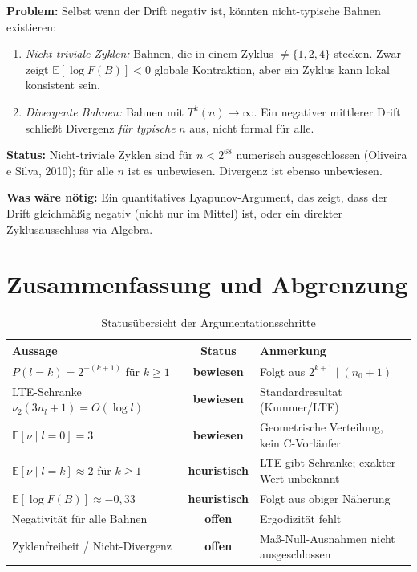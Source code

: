 \documentclass[12pt,a4paper]{article}
\newcommand{\vii}{\nu_2}
\newcommand{\E}{\mathbb{E}}
\newcommand{\logF}{\log F(B)}
\begin{document}
\begin{tcolorbox}[lücke, title={Offene Lücke 2: Maß-Null-Ausnahmen}]
\textbf{Problem:} Selbst wenn der Drift negativ ist, könnten
nicht-typische Bahnen existieren:
\begin{enumerate}[noitemsep]
  \item \emph{Nicht-triviale Zyklen:} Bahnen, die in einem Zyklus
        $\neq \{1,2,4\}$ stecken.
        Zwar zeigt $\E[\logF] < 0$ globale Kontraktion,
        aber ein Zyklus kann lokal konsistent sein.
  \item \emph{Divergente Bahnen:} Bahnen mit $T^k(n) \to \infty$.
        Ein negativer mittlerer Drift schließt Divergenz
        \emph{für typische} $n$ aus, nicht formal für alle.
\end{enumerate}

\textbf{Status:}
Nicht-triviale Zyklen sind für $n < 2^{68}$ numerisch ausgeschlossen
(Oliveira e Silva, 2010); für alle $n$ ist es unbewiesen.
Divergenz ist ebenso unbewiesen.

\textbf{Was wäre nötig:}
Ein quantitatives Lyapunov-Argument, das zeigt, dass der Drift
gleichmäßig negativ (nicht nur im Mittel) ist,
oder ein direkter Zyklusausschluss via Algebra.
\end{tcolorbox}

\section{Zusammenfassung und Abgrenzung}
\label{sec:zusammenfassung}

\begin{table}[h!]
\centering
\caption{Statusübersicht der Argumentationsschritte}
\label{tab:status}
\renewcommand{\arraystretch}{1.4}
\begin{tabular}{p{5.5cm} c p{6.5cm}}
\toprule
\textbf{Aussage} & \textbf{Status} & \textbf{Anmerkung} \\
\midrule
$P(l=k) = 2^{-(k+1)}$ für $k \geq 1$
  & \textcolor{bewiesengrün}{\textbf{bewiesen}}
  & Folgt aus $2^{k+1} \mid (n_0+1)$ \\
LTE-Schranke $\vii(3n_l+1) = O(\log l)$
  & \textcolor{bewiesengrün}{\textbf{bewiesen}}
  & Standardresultat (Kummer/LTE) \\
$\E[\nu \mid l{=}0] = 3$
  & \textcolor{bewiesengrün}{\textbf{bewiesen}}
  & Geometrische Verteilung, kein C-Vorläufer \\
$\E[\nu \mid l{=}k] \approx 2$ für $k \geq 1$
  & \textcolor{warnorange}{\textbf{heuristisch}}
  & LTE gibt Schranke; exakter Wert unbekannt \\
$\E[\logF] \approx -0{,}33$
  & \textcolor{warnorange}{\textbf{heuristisch}}
  & Folgt aus obiger Näherung \\
Negativität für alle Bahnen
  & \textcolor{lückenrot}{\textbf{offen}}
  & Ergodizität fehlt \\
Zyklenfreiheit / Nicht-Divergenz
  & \textcolor{lückenrot}{\textbf{offen}}
  & Maß-Null-Ausnahmen nicht ausgeschlossen \\
\bottomrule
\end{tabular}
\end{table}
\end{document}
